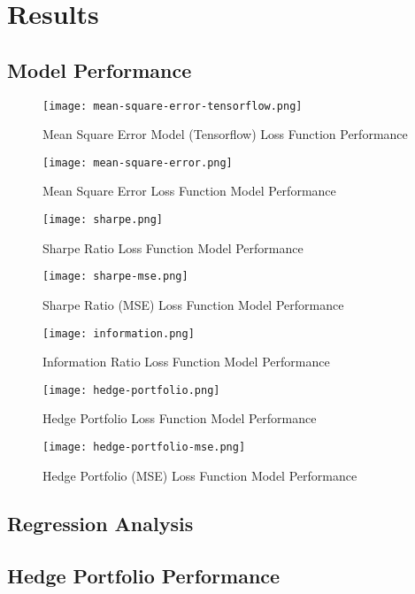 \documentclass[12pt]{article}
\begin{document}
\section{Results}
\subsection{Model Performance}
\begin{figure}[H]
    \centering
    \texttt{[image: mean-square-error-tensorflow.png]}
    \caption{Mean Square Error Model (Tensorflow) Loss Function Performance}
    \label{fig:mse-tf-performance}
\end{figure}
\begin{figure}[H]
    \centering
    \texttt{[image: mean-square-error.png]}
    \caption{Mean Square Error Loss Function Model Performance}
    \label{fig:mse-performance}
\end{figure}
\begin{figure}[H]
    \centering
    \texttt{[image: sharpe.png]}
    \caption{Sharpe Ratio Loss Function Model Performance}
    \label{fig:sr-performance}
\end{figure}
\begin{figure}[H]
    \centering
    \texttt{[image: sharpe-mse.png]}
    \caption{Sharpe Ratio (MSE) Loss Function Model Performance}
    \label{fig:sr-mse-performance}
\end{figure}
\begin{figure}[H]
    \centering
    \texttt{[image: information.png]}
    \caption{Information Ratio Loss Function Model Performance}
    \label{fig:ir-performance}
\end{figure}
\begin{figure}[H]
    \centering
    \texttt{[image: hedge-portfolio.png]}
    \caption{Hedge Portfolio Loss Function Model Performance}
    \label{fig:hp-performance}
\end{figure}
\begin{figure}[H]
    \centering
    \texttt{[image: hedge-portfolio-mse.png]}
    \caption{Hedge Portfolio (MSE) Loss Function Model Performance}
    \label{fig:hp-mse-performance}
\end{figure}
\subsection{Regression Analysis}
\subsection{Hedge Portfolio Performance}
\end{document}
